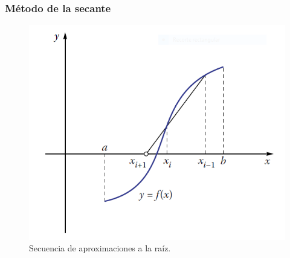\begin{frame}[fragile]
\frametitle{Método de la secante}
\begin{figure}[h!]
	\centering
	\includegraphics[scale=0.5]{Imagenes/raices_metodosecante_01.png}
	\caption{Secuencia de aproximaciones a la raíz.}
\end{figure}
		

		

		

\end{frame}
